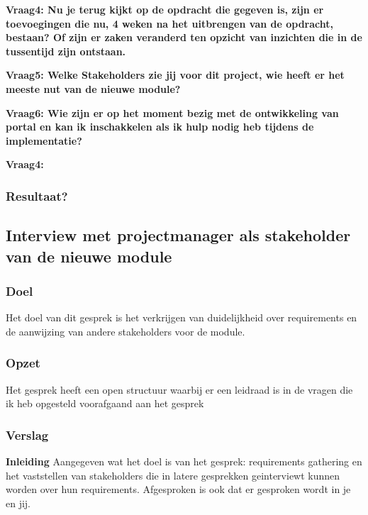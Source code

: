 \textbf{Vraag4: Nu je terug kijkt op de opdracht die gegeven is, zijn er toevoegingen die nu, 4 weken na het uitbrengen van de opdracht, bestaan? Of zijn er zaken veranderd ten opzicht van inzichten die in de tussentijd zijn ontstaan.}

\lipsum[05]
\bigskip

\textbf{Vraag5: Welke Stakeholders zie jij voor dit project, wie heeft er het meeste nut van de nieuwe module? }

\lipsum[06]
\bigskip

\textbf{Vraag6: Wie zijn er op het moment bezig met de ontwikkeling van portal en kan ik inschakkelen als ik hulp nodig heb tijdens de implementatie?}

\lipsum[09]
\bigskip

\textbf{Vraag4: }

\lipsum[07]

\subsubsection{Resultaat?}

\subsection{Interview met projectmanager als stakeholder van de nieuwe module}

\subsubsection{Doel}
Het doel van dit gesprek is het verkrijgen van duidelijkheid over requirements en de aanwijzing van andere stakeholders voor de module.

\subsubsection{Opzet}
Het gesprek heeft een open structuur waarbij er een leidraad is in de vragen die ik heb opgesteld voorafgaand aan het gesprek

\subsubsection{Verslag}
\textbf{Inleiding}
Aangegeven wat het doel is van het gesprek: requirements gathering en het vaststellen van stakeholders die in latere gesprekken geinterviewt kunnen worden over hun requirements. Afgesproken is ook dat er gesproken wordt in je en jij.

